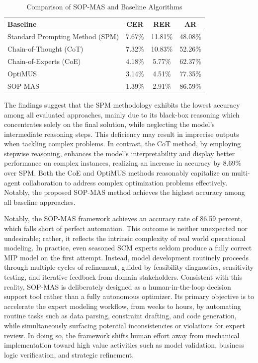 \documentclass[preprint,12pt]{elsarticle}
\begin{document}
\begin{table}[t]%
\caption{Comparison of SOP-MAS and Baseline Algorithms}\label{tab:benchmark}

\centering%
\begin{tabular}{l c c c}
\hline
Baseline & CER & RER & AR \\
\hline
Standard Prompting Method (SPM) & 7.67\% & 11.81\% & 48.08\% \\
Chain-of-Thought (CoT) & 7.32\% & 10.83\% & 52.26\% \\
Chain-of-Experts (CoE) & 4.18\% & 5.77\% & 62.37\% \\
OptiMUS & 3.14\% & 4.51\% & 77.35\% \\
SOP-MAS & 1.39\% & 2.91\% & 86.59\% \\
\hline
\end{tabular}
\end{table}


The findings suggest that the SPM methodology exhibits the lowest accuracy among all evaluated approaches, mainly due to its black-box reasoning which concentrates solely on the final solution, while neglecting the model's intermediate reasoning steps. This deficiency may result in imprecise outputs when tackling complex problems. In contrast, the CoT method, by employing stepwise reasoning, enhances the model's interpretability and display better performance on complex instances, realizing an increase in accuracy by 8.69\% over SPM. Both the CoE and OptiMUS methods reasonably capitalize on multi-agent collaboration to address complex optimization problems effectively. Notably, the proposed SOP-MAS method achieves the highest accuracy among all baseline approaches.

Notably, the SOP-MAS framework achieves an accuracy rate of 86.59 percent, which falls short of perfect automation. This outcome is neither unexpected nor undesirable; rather, it reflects the intrinsic complexity of real world operational modeling. In practice, even seasoned SCM experts seldom produce a fully correct MIP model on the first attempt. Instead, model development routinely proceeds through multiple cycles of refinement, guided by feasibility diagnostics, sensitivity testing, and iterative feedback from domain stakeholders. Consistent with this reality, SOP-MAS is deliberately designed as a human-in-the-loop decision support tool rather than a fully autonomous optimizer. Its primary objective is to accelerate the expert modeling workflow, from weeks to hours, by automating routine tasks such as data parsing, constraint drafting, and code generation, while simultaneously surfacing potential inconsistencies or violations for expert review. In doing so, the framework shifts human effort away from mechanical implementation toward high value activities such as model validation, business logic verification, and strategic refinement.
\end{document}
